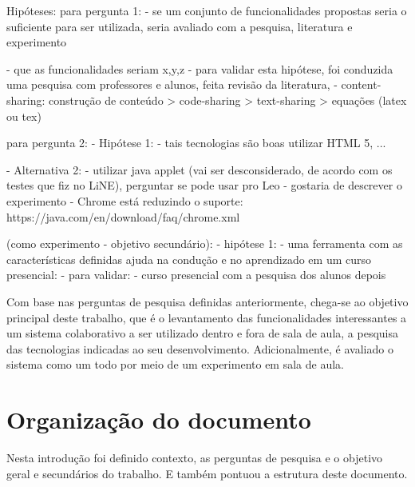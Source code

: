                     Hipóteses:
                    para pergunta 1:
                        - se um conjunto de funcionalidades propostas seria o suficiente para ser utilizada, seria avaliado com a pesquisa, literatura e experimento

                        - que as funcionalidades seriam x,y,z
                            - para validar esta hipótese, foi conduzida uma pesquisa com professores e alunos, feita revisão da literatura, 
                        - content-sharing: construção de conteúdo > code-sharing > text-sharing > equações (latex ou tex)

                    para pergunta 2:
                        - Hipótese 1:
                            - tais tecnologias são boas utilizar HTML 5, ...

                            - Alternativa 2:
                                - utilizar java applet (vai ser desconsiderado, de acordo com os testes que fiz no LiNE), perguntar se pode usar pro Leo - gostaria de descrever o experimento
                                - Chrome está reduzindo o suporte:
                                    https://java.com/en/download/faq/chrome.xml

                    (como experimento - objetivo secundário):
                        - hipótese 1:
                            - uma ferramenta com as características definidas ajuda na condução e no aprendizado em um curso presencial:
                            - para validar:
                                - curso presencial com a pesquisa dos alunos depois





Com base nas perguntas de pesquisa definidas anteriormente, chega-se ao objetivo principal deste trabalho, que é o levantamento das funcionalidades interessantes a um sistema colaborativo a ser utilizado dentro e fora de sala de aula, a pesquisa das tecnologias indicadas ao seu desenvolvimento. Adicionalmente, é avaliado o sistema como um todo por meio de um experimento em sala de aula.

\section{Organização do documento}

Nesta introdução foi definido contexto, as perguntas de pesquisa e o objetivo geral e secundários do trabalho. E também pontuou a estrutura deste documento.

